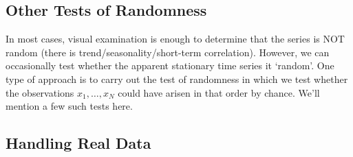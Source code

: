 \subsection{Other Tests of Randomness}
In most cases, visual examination is enough to determine that the series is NOT random (there is trend/seasonality/short-term correlation). However, we can occasionally test whether the apparent stationary time series it `random'. One type of approach is to carry out the test of randomness in which we test whether the observations $x_1, \dots, x_N$ could have arisen in that order by chance. We'll mention a few such tests here. 



\subsection{Handling Real Data}


